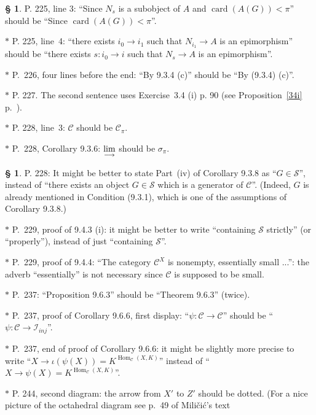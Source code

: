 \documentclass[12pt]{article}%
\theoremstyle{remark}
\theoremstyle{definition}
\newtheorem{s}[thm]{\S}%
\newcommand{\nn}{\noindent}
\newcommand{\cc}{\mathcal}
\newcommand{\C}{\mathcal C}
\newcommand{\ilim}{\operatornamewithlimits{\underset{\longrightarrow}{lim}}}
\DeclareMathOperator{\card}{card}%
\DeclareMathOperator{\Hom}{Hom}%
\begin{document}
\begin{s}\label{225}
P. 225, line 3: ``Since $N_s$ is a subobject of $A$ and $\card(A(G))<\pi$'' should be ``Since $\card(A(G))<\pi$''.

\nn $*$ P. 225, line~4: ``there exists $i_0\to i_1$ such that $N_{i_1}\to A$ is an epimorphism'' should be ``there exists $s:i_0\to i$ such that $N_s\to A$ is an epimorphism''.
\end{s}

\noindent $*$ P.~226, four lines before the end: ``By 9.3.4 (c)'' should be ``By (9.3.4) (c)''.

\noindent $*$ P. 227. The second sentence uses Exercise~3.4 (i) p. 90 (see Proposition~\ref{34i} p.~\pageref{34i}).

\noindent $*$ P. 228, line~3: $\C$ should be $\C_\pi$.

\noindent $*$ P.~228, Corollary 9.3.6: $\ilim$ should be $\sigma_\pi$.

\begin{s}\label{228}
P. 228: It might be better to state Part~(iv) of Corollary 9.3.8 as ``$G\in\cc S$'', instead of ``there exists an object $G\in\cc S$ which is a generator of $\C$''. (Indeed, $G$ is already mentioned in Condition (9.3.1), which is one of the assumptions of Corollary 9.3.8.)
\end{s}

\noindent $*$ P.~229, proof of 9.4.3 (i): it might be better to write ``containing $\mathcal S$ strictly'' (or ``properly''), instead of just ``containing $\mathcal S$''. 

\noindent $*$ P.~229, proof of 9.4.4: ``The category $\C^X$ is nonempty, essentially small ...'': the adverb ``essentially'' is not necessary since $\C$ is supposed to be small.

\noindent $*$ P.~237: ``Proposition 9.6.3'' should be ``Theorem 9.6.3'' (twice). 

\noindent $*$ P.~237, proof of Corollary 9.6.6, first display: ``$\psi:\C\to\C$'' should be ``$\psi:\C\to\mathcal I_{inj}$''. %

\noindent $*$ P.~237, end of proof of Corollary 9.6.6: it might be slightly more precise to write ``$X\to\iota(\psi(X))=K^{\Hom_\C(X,K)}$'' instead of ``$X\to\psi(X)=K^{\Hom_\C(X,K)}$''.

\noindent $*$ P. 244, second diagram: the arrow from $X'$ to $Z'$ should be dotted. (For a nice picture of the octahedral diagram see p.~49 of Mili\v{c}i\'c's text
\end{document}
